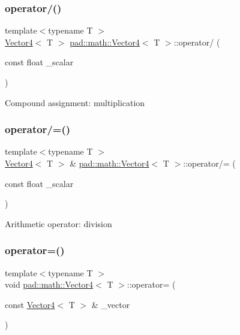 \subsubsection{\texorpdfstring{operator/()}{operator/()}}
{\footnotesize\ttfamily template$<$typename T $>$ \\
\mbox{\hyperlink{structpad_1_1math_1_1_vector4}{Vector4}}$<$ T $>$ \mbox{\hyperlink{structpad_1_1math_1_1_vector4}{pad\+::math\+::\+Vector4}}$<$ T $>$\+::operator/ (\begin{DoxyParamCaption}\item[{const float}]{\+\_\+scalar }\end{DoxyParamCaption})}

Compound assignment\+: multiplication \mbox{\label{structpad_1_1math_1_1_vector4_a3703b229047d4cd251215a409c8ad7a5}} 
\subsubsection{\texorpdfstring{operator/=()}{operator/=()}}
{\footnotesize\ttfamily template$<$typename T $>$ \\
\mbox{\hyperlink{structpad_1_1math_1_1_vector4}{Vector4}}$<$ T $>$ \& \mbox{\hyperlink{structpad_1_1math_1_1_vector4}{pad\+::math\+::\+Vector4}}$<$ T $>$\+::operator/= (\begin{DoxyParamCaption}\item[{const float}]{\+\_\+scalar }\end{DoxyParamCaption})}

Arithmetic operator\+: division \mbox{\label{structpad_1_1math_1_1_vector4_ac705833566aae9930fa13586833a535b}} 
\subsubsection{\texorpdfstring{operator=()}{operator=()}\hspace{0.1cm}{\footnotesize\ttfamily [1/2]}}
{\footnotesize\ttfamily template$<$typename T $>$ \\
void \mbox{\hyperlink{structpad_1_1math_1_1_vector4}{pad\+::math\+::\+Vector4}}$<$ T $>$\+::operator= (\begin{DoxyParamCaption}\item[{const \mbox{\hyperlink{structpad_1_1math_1_1_vector4}{Vector4}}$<$ T $>$ \&}]{\+\_\+vector }\end{DoxyParamCaption})}

